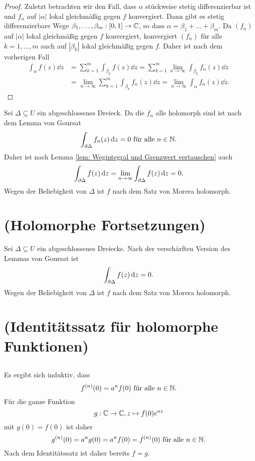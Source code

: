 \documentclass[a4paper,10pt]{article}
\begin{document}
\begin{proof}
Zuletzt betrachten wir den Fall, dass $\alpha$ stückweise stetig differenzierbar ist und $f_n$ auf $|\alpha|$ lokal gleichmäßig gegen $f$ konvergiert. Dann gibt es stetig differenzierbare Wege $\beta_1, \ldots, \beta_m : [0,1] \to \mathbb{C}$, so dass $\alpha = \beta_1 + \ldots + \beta_m$. Da $(f_n)$ auf $|\alpha|$ lokal gleichmäßig gegen $f$ konvergiert, konvergiert $(f_n)$ für alle $k = 1, \ldots, m$ auch auf $|\beta_k|$ lokal gleichmäßig gegen $f$. Daher ist nach dem vorherigen Fall
\begin{align*}
 \int_\alpha f(z) \dd{z}
 &= \sum_{k=1}^m \int_{\beta_k} f(z) \dd{z}
 = \sum_{k=1}^m \lim_{n \to \infty} \int_{\beta_k} f_n(z) \dd{z} \\
 &= \lim_{n \to \infty} \sum_{k=1}^m \int_{\beta_k} f_n(z) \dd{z}
 = \lim_{n \to \infty} \int_\alpha f_n(z) \dd{z}.
\end{align*}
\end{proof}

Sei $\Delta \subseteq U$ ein abgeschlossenes Dreieck. Da die $f_n$ alle holomorph sind ist nach dem Lemma von Goursat
\[
 \int_{\partial \Delta} f_n(z) \,\text{d}z = 0 \text{ für alle } n \in \mathbb{N}.
\]
Daher ist nach Lemma \ref{lem: Wegintegral und Grenzwert vertauschen} auch
\[
 \int_{\partial \Delta} f(z) \,\text{d}z
 = \lim_{n \to \infty} \int_{\partial \Delta} f(z) \,\text{d}z
 = 0.
\]
Wegen der Beliebigkeit von $\Delta$ ist $f$ nach dem Satz von Morera holomorph.





\section{(Holomorphe Fortsetzungen)}
Sei $\Delta \subseteq U$ ein abgeschlossenes Dreiecks. Nach der verschärften Version des Lemmas von Goursat ist
\[
 \int_{\partial \Delta} f(z) \,\text{d}z = 0.
\]
Wegen der Beliebigkeit von $\Delta$ ist $f$ nach dem Satz von Morera holomorph.





\section{(Identitätssatz für holomorphe Funktionen)}


\subsection{}
Es ergibt sich induktiv, dass
\[
 f^{(n)}(0) = a^n f(0) \text{ für alle } n \in \mathbb{N}.
\]
Für die ganze Funktion
\[
 g : \mathbb{C} \to \mathbb{C}, z \mapsto f(0) e^{az}
\]
mit $g(0) = f(0)$ ist daher
\[
 g^{(n)}(0) = a^n g(0) = a^n f(0) = f^{(n)}(0) \text{ für alle } n \in \mathbb{N}.
\]
Nach dem Identitätssatz ist daher bereits $f = g$.
\end{document}
